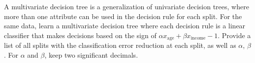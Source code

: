 \item {} A multivariate decision tree is a generalization of univariate decision trees, where more than one attribute can be used in the decision rule for each split. For the same data, learn a multivariate decision tree where each decision rule is a linear classifier that makes decisions based on the sign of $\alpha x_{\text{age}} +\beta x_{\text{income}} -1$. Provide a list of all splits with the classification error reduction at each split, as well as $\alpha$, $\beta$. For $\alpha$ and $\beta$, keep two significant decimals.

